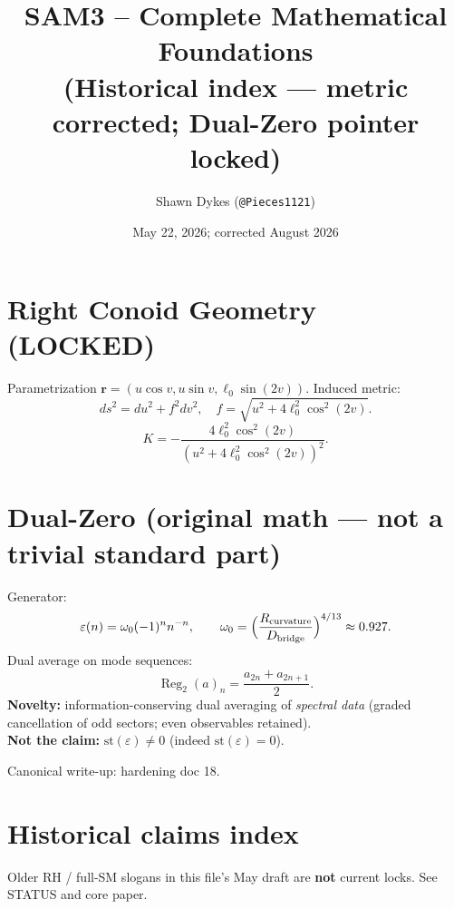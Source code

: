 \documentclass[11pt,a4paper]{article}
\title{\textbf{SAM3 -- Complete Mathematical Foundations}\\[0.3em]
\large (Historical index — metric corrected; Dual-Zero pointer locked)}
\author{Shawn Dykes (\texttt{@Pieces1121})}
\date{May 22, 2026; corrected August 2026}
\begin{document}
\maketitle

\begin{center}
\end{center}

\section{Right Conoid Geometry (LOCKED)}

Parametrization $\mathbf{r}=(u\cos v,u\sin v,\ell_0\sin(2v))$.
Induced metric:
\[
ds^2=du^2+f^2 dv^2,\quad f=\sqrt{u^2+4\ell_0^2\cos^2(2v)}.
\]
\[
K=-\frac{4\ell_0^2\cos^2(2v)}{(u^2+4\ell_0^2\cos^2(2v))^2}.
\]

\section{Dual-Zero (original math — not a trivial standard part)}

Generator:
\[
\varepsilon(n)=\omega_0(-1)^n n^{-n},\qquad
\omega_0=\Bigl(\frac{R_{\rm curvature}}{D_{\rm bridge}}\Bigr)^{4/13}\approx 0.927.
\]
Dual average on mode sequences:
\[
\operatorname{Reg}_2(a)_n=\frac{a_{2n}+a_{2n+1}}{2}.
\]
\textbf{Novelty:} information-conserving dual averaging of \emph{spectral data}
(graded cancellation of odd sectors; even observables retained).\\
\textbf{Not the claim:} $\mathrm{st}(\varepsilon)\neq 0$ (indeed $\mathrm{st}(\varepsilon)=0$).

Canonical write-up: hardening doc 18.

\section{Historical claims index}

Older RH / full-SM slogans in this file’s May draft are \textbf{not} current locks.
See STATUS and core paper.
\end{document}
